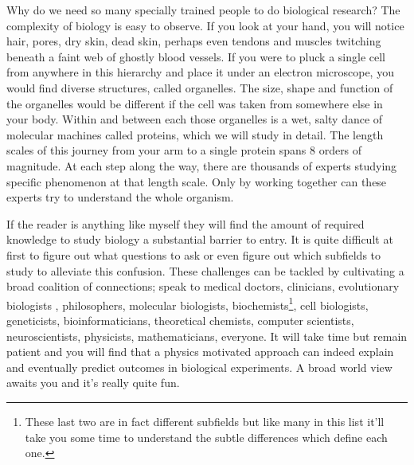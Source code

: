 Why do we need so many specially trained people to do biological research? The complexity of biology is easy to observe. If you look at your hand, you will notice hair, pores, dry skin, dead skin, perhaps even tendons and muscles twitching beneath a faint web of ghostly blood vessels. If you were to pluck a single cell from anywhere in this hierarchy and place it under an electron microscope, you would find diverse structures, called organelles. The size, shape and function of the organelles would be different if the cell was taken from somewhere else in your body. Within and between each those organelles is a wet, salty dance of molecular machines called proteins, which we will study in detail. The length scales of this journey from your arm to a single protein spans 8 orders of magnitude. At each step along the way, there are thousands of experts studying specific phenomenon at that length scale. Only by working together can these experts try to understand the whole organism.

If the reader is anything like myself they will find the amount of required knowledge to study biology a substantial barrier to entry. It is quite difficult at first to figure out what questions to ask or even figure out which subfields to study to alleviate this confusion. These challenges can be tackled by cultivating a broad coalition of connections; speak to medical doctors, clinicians, evolutionary biologists \cite{dawkins1989, dawkins2016}, philosophers, molecular biologists, biochemists\footnote{These last two are in fact different subfields but like many in this list it'll take you some time to understand the subtle differences which define each one.}, cell biologists\cite{pollard2016}, geneticists, bioinformaticians, theoretical chemists, computer scientists, neuroscientists, physicists, mathematicians, everyone. It will take time but remain patient and you will find that a physics motivated approach can indeed explain and eventually predict outcomes in biological experiments. A broad world view awaits you and it's really quite fun. 


